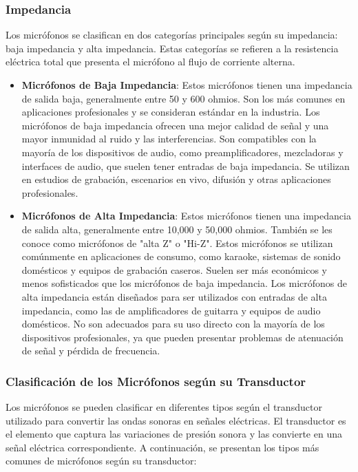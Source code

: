 \documentclass[
	12pt, %
	fleqn, %
	a4paper, %
	oneside, %
]{LegrandOrangeBook}
\begin{document}
\subsubsection{Impedancia}
Los micrófonos se clasifican en dos categorías principales según su impedancia: baja impedancia y alta impedancia. Estas categorías se refieren a la resistencia eléctrica total que presenta el micrófono al flujo de corriente alterna.

\begin{itemize}
\item \textbf{Micrófonos de Baja Impedancia}: Estos micrófonos tienen una impedancia de salida baja, generalmente entre 50 y 600 ohmios. Son los más comunes en aplicaciones profesionales y se consideran estándar en la industria. Los micrófonos de baja impedancia ofrecen una mejor calidad de señal y una mayor inmunidad al ruido y las interferencias. Son compatibles con la mayoría de los dispositivos de audio, como preamplificadores, mezcladoras y interfaces de audio, que suelen tener entradas de baja impedancia. Se utilizan en estudios de grabación, escenarios en vivo, difusión y otras aplicaciones profesionales.
\item \textbf{Micrófonos de Alta Impedancia}: Estos micrófonos tienen una impedancia de salida alta, generalmente entre 10,000 y 50,000 ohmios. También se les conoce como micrófonos de "alta Z" o "Hi-Z". Estos micrófonos se utilizan comúnmente en aplicaciones de consumo, como karaoke, sistemas de sonido domésticos y equipos de grabación caseros. Suelen ser más económicos y menos sofisticados que los micrófonos de baja impedancia. Los micrófonos de alta impedancia están diseñados para ser utilizados con entradas de alta impedancia, como las de amplificadores de guitarra y equipos de audio domésticos. No son adecuados para su uso directo con la mayoría de los dispositivos profesionales, ya que pueden presentar problemas de atenuación de señal y pérdida de frecuencia.
\end{itemize}

\subsubsection{Clasificación de los Micrófonos según su Transductor}

Los micrófonos se pueden clasificar en diferentes tipos según el transductor utilizado para convertir las ondas sonoras en señales eléctricas. El transductor es el elemento que captura las variaciones de presión sonora y las convierte en una señal eléctrica correspondiente. A continuación, se presentan los tipos más comunes de micrófonos según su transductor:
\end{document}
